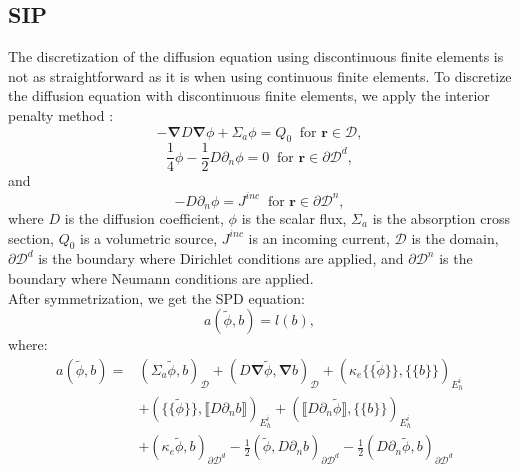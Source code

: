 \documentclass[preprint,10pt]{elsarticle}
\newcommand\bn{\boldsymbol{\nabla}}
\newcommand\br{\mathbf{r}}
\newcommand\ldb{\{\!\!\{}
\newcommand\rdb{\}\!\!\}}
\newcommand\llb{\llbracket}
\newcommand\rrb{\rrbracket}
\newcommand\mc{\mathcal}
\renewcommand{\(}{\left(}
\renewcommand{\)}{\right)}
\renewcommand{\[}{\left[}
\renewcommand{\]}{\right]}
\begin{document}
 
\subsection{SIP}

The discretization of the diffusion equation using discontinuous finite
elements is not as straightforward as it is when using continuous finite
elements. To discretize the diffusion equation with discontinuous finite elements, 
we apply the interior penalty method \cite{Kanschat2007}:
\begin{equation}
  -\bn D \bn \phi + \Sigma_a \phi = Q_0\ \textrm{ for } \br \in \mc{D},
\end{equation}
\begin{equation}
  \frac{1}{4}\phi - \frac{1}{2} D \partial_n \phi =0\ \textrm{ for } \br \in
  \partial \mc{D}^d,
\end{equation}
and
\begin{equation}
  -D \partial_n \phi = J^{inc}\ \textrm{ for } \br \in \partial \mc{D}^n,
\end{equation}
where $D$ is the diffusion coefficient, $\phi$ is the scalar flux, $\Sigma_a$
is the absorption cross section, $Q_0$ is a volumetric source, $J^{inc}$ is an
incoming current, $\mc{D}$ is the domain, $\partial \mc{D}^d$ is the boundary 
where Dirichlet conditions are applied, and $\partial \mc{D}^n$ is the boundary 
where Neumann conditions are applied.\\ 
After symmetrization, we get the SPD equation:
\begin{equation}
  a(\tilde{\phi},b) = l(b),
\end{equation}
where:
\begin{equation}
  \begin{split}
    a (\tilde{\phi},b) =& \(\Sigma_a \tilde{\phi},b\)_{\mc{D}} + 
    \(D\bn\tilde{\phi},\bn b\)_{\mc{D}} +
    (\kappa_e\ldb\tilde{\phi}\rdb,\ldb b \rdb)_{E_h^i}\\
    &+ \(\ldb\tilde{\phi}\rdb,\llb D\partial_n b \rrb\)_{E_h^i}+ \(\llb D
    \partial_n \tilde{\phi}\rrb,\ldb b \rdb\)_{E_h^i}\\
    &+ \(\kappa_e \tilde{\phi}, b\)_{\partial \mc{D}^d}
    -\frac{1}{2}\(\tilde{\phi},D\partial_n b\)_{\partial \mc{D}^d}
    -\frac{1}{2}\(D\partial_n\tilde{\phi},b\)_{\partial \mc{D}^d}
  \end{split}
\end{equation}
\end{document}
